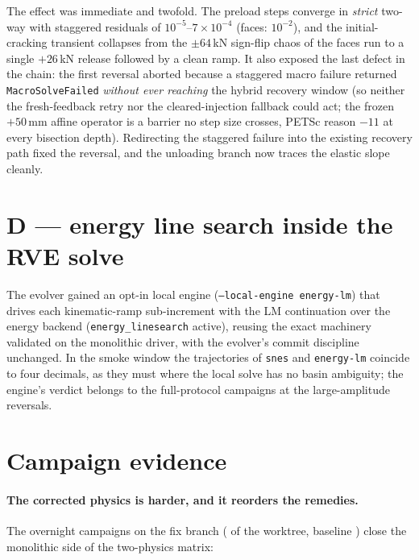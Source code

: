 The effect was immediate and twofold. The preload steps converge in
\emph{strict} two-way with staggered residuals of
$10^{-5}$--$7\times10^{-4}$ (faces: $10^{-2}$), and the
initial-cracking transient collapses from the $\pm 64$\,kN sign-flip
chaos of the faces run to a single $+26$\,kN release followed by a
clean ramp. It also exposed the last defect in the chain: the first
reversal aborted because a staggered macro failure returned
\texttt{MacroSolveFailed} \emph{without ever reaching} the hybrid
recovery window (so neither the fresh-feedback retry nor the
cleared-injection fallback could act; the frozen $+50$\,mm affine
operator is a barrier no step size crosses, PETSc reason $-11$ at
every bisection depth). Redirecting the staggered failure into the
existing recovery path fixed the reversal, and the unloading branch
now traces the elastic slope cleanly.

\section{D --- energy line search inside the RVE solve}
\label{sec:kb-d}

The evolver gained an opt-in local engine
(\texttt{--local-engine energy-lm}) that drives each kinematic-ramp
sub-increment with the LM continuation over the energy backend
(\texttt{energy\_linesearch} active), reusing the exact machinery
validated on the monolithic driver, with the evolver's
commit discipline unchanged. In the smoke window the trajectories of
\texttt{snes} and \texttt{energy-lm} coincide to four decimals, as
they must where the local solve has no basin ambiguity; the engine's
verdict belongs to the full-protocol campaigns at the large-amplitude
reversals.

\section{Campaign evidence}
\label{sec:kb-evidence}

\paragraph{The corrected physics is harder, and it reorders the
remedies.} The overnight campaigns on the fix branch
( of the worktree, baseline ) close
the monolithic side of the two-physics matrix:

